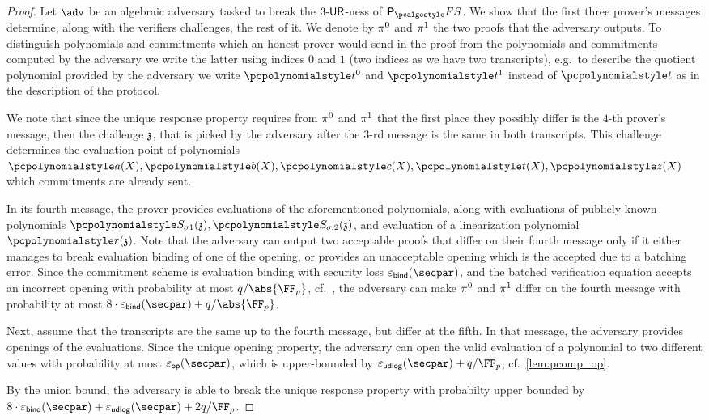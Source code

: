 \begin{proof}
  Let $\adv$ be an algebraic adversary tasked to break the ${3\text{-}\mathsf{UR}}$-ness of
	$\plonkprotfs$. We show that the first three prover's messages determine, along with 	the verifiers challenges, the rest of it. We denote by $\pi^0$ and $\pi^1$ the two proofs that the adversary outputs. To distinguish polynomials and commitments which an honest prover would send in the proof from the polynomials and commitments computed by the adversary we write the latter using indices $0$ and $1$ (two indices as we have two transcripts), e.g.~to describe the quotient polynomial provided by the adversary we write $\p{t}^0$ and $\p{t}^1$ instead of $\p{t}$ as in the description of the protocol.

  We note that since the unique response property requires from $\pi^{0}$ and $\pi^{1}$ that the first place they possibly differ is the $4$-th prover's message, then the challenge $\mathfrak{z}$, that is picked by the adversary after the $3$-rd message is the same in both transcripts. This challenge determines the evaluation point of polynomials $\p{a}(X), \p{b}(X), \p{c}(X), \p{t}(X), \p{z}(X)$ which commitments are already sent.

  In its fourth message, the prover provides evaluations of the aforementioned polynomials, along with evaluations of publicly known polynomials $
  \p{S_{\sigma 1}} (\chz), \p{S_{\sigma, 2}} (\chz)$, and evaluation of a linearization polynomial $\p{r}(\chz)$.
  Note that the adversary can output two acceptable proofs that differ on their fourth message only if it either manages to break evaluation binding of one of the opening, or provides an unacceptable opening which is the accepted due to a batching error. Since the commitment scheme is evaluation binding with security loss $\epsbinding (\secpar)$, and the batched verification equation accepts an incorrect opening with probability at most $\infrac{q}{\abs{\FF_p}}$, cf.~\cite{EPRINT:GabWilCio19}, the adversary can make $\pi^{0}$ and $\pi^{1}$ differ on the fourth message with probability at most $8  \cdot \epsbinding (\secpar) + \infrac{q}{\abs{\FF_p}}$. 

  Next, assume that the transcripts are the same up to the fourth message, but differ at the fifth. In that message, the adversary provides openings of the evaluations. Since the unique opening property, the adversary can open the valid evaluation of a polynomial to two different values with probability at most $\epsop (\secpar)$, which is upper-bounded by $\epsudlog (\secpar) + \infrac{q}{\FF_p}$, cf.~\cref{lem:pcomp_op}.

  By the union bound, the adversary is able to break the unique response property with probabilty upper bounded by $8  \cdot \epsbinding (\secpar) + \epsudlog (\secpar) + 2 \infrac{q}{\FF_p}$.
  \end{proof}

